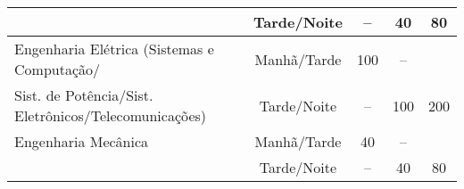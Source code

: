 \begin{table}
\begin{tabularx}{\textwidth}{|X|c|c|c|c|}
		                                                      & Tarde/Noite                     & --                                  & 40                                 & 80  \\
		\hline
		Engenharia Elétrica (Sistemas e Computação/           & Manhã/Tarde                     & 100                                 & --                                 &     \\
		Sist. de Potência/Sist. Eletrônicos/Telecomunicações) & Tarde/Noite                     & --                                  & 100                                & 200 \\
		\hline
		Engenharia Mecânica                                   & Manhã/Tarde                     & 40                                  & --                                 &     \\
		                                                      & Tarde/Noite                     & --                                  & 40                                 & 80  \\
		\hline
	\end{tabularx}
\end{table}
